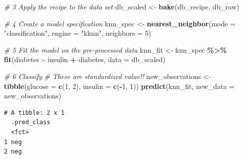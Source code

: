 \documentclass[
]{book}
\newenvironment{Shaded}{\begin{snugshade}}{\end{snugshade}}
\newcommand{\AttributeTok}[1]{\textcolor[rgb]{0.13,0.29,0.53}{#1}}
\newcommand{\CommentTok}[1]{\textcolor[rgb]{0.56,0.35,0.01}{\textit{#1}}}
\newcommand{\DecValTok}[1]{\textcolor[rgb]{0.00,0.00,0.81}{#1}}
\newcommand{\FunctionTok}[1]{\textcolor[rgb]{0.13,0.29,0.53}{\textbf{#1}}}
\newcommand{\NormalTok}[1]{#1}
\newcommand{\OtherTok}[1]{\textcolor[rgb]{0.56,0.35,0.01}{#1}}
\newcommand{\SpecialCharTok}[1]{\textcolor[rgb]{0.81,0.36,0.00}{\textbf{#1}}}
\newcommand{\StringTok}[1]{\textcolor[rgb]{0.31,0.60,0.02}{#1}}
\begin{document}
\begin{Shaded}
\begin{Highlighting}[]
\CommentTok{\# 3 Apply the recipe to the data set}
\NormalTok{db\_scaled }\OtherTok{\textless{}{-}}  \FunctionTok{bake}\NormalTok{(db\_recipe, db\_raw)}
\end{Highlighting}
\end{Shaded}

\begin{Shaded}
\begin{Highlighting}[]
\CommentTok{\# 4 Create a model specification}
\NormalTok{knn\_spec }\OtherTok{\textless{}{-}} \FunctionTok{nearest\_neighbor}\NormalTok{(}\AttributeTok{mode =} \StringTok{"classification"}\NormalTok{,}
                             \AttributeTok{engine =} \StringTok{"kknn"}\NormalTok{,}
                             \AttributeTok{neighbors =} \DecValTok{5}\NormalTok{)}
\end{Highlighting}
\end{Shaded}

\begin{Shaded}
\begin{Highlighting}[]
\CommentTok{\# 5 Fit the model on the pre{-}processed data}
\NormalTok{knn\_fit }\OtherTok{\textless{}{-}}\NormalTok{ knn\_spec }\SpecialCharTok{\%\textgreater{}\%}
 \FunctionTok{fit}\NormalTok{(diabetes }\SpecialCharTok{\textasciitilde{}}\NormalTok{ insulin }\SpecialCharTok{+}\NormalTok{ diabetes, }\AttributeTok{data =}\NormalTok{ db\_scaled)}
\end{Highlighting}
\end{Shaded}

\begin{Shaded}
\begin{Highlighting}[]
\CommentTok{\# 6 Classify}
\CommentTok{\# These are standardized value!!}
\NormalTok{new\_observations }\OtherTok{\textless{}{-}} \FunctionTok{tibble}\NormalTok{(}\AttributeTok{glucose =} \FunctionTok{c}\NormalTok{(}\DecValTok{1}\NormalTok{, }\DecValTok{2}\NormalTok{), }\AttributeTok{insulin =} \FunctionTok{c}\NormalTok{(}\SpecialCharTok{{-}}\DecValTok{1}\NormalTok{, }\DecValTok{1}\NormalTok{))}
\FunctionTok{predict}\NormalTok{(knn\_fit, }\AttributeTok{new\_data =}\NormalTok{ new\_observations)}
\end{Highlighting}
\end{Shaded}

\begin{verbatim}
# A tibble: 2 x 1
  .pred_class
  <fct>      
1 neg        
2 neg        
\end{verbatim}
\end{document}
